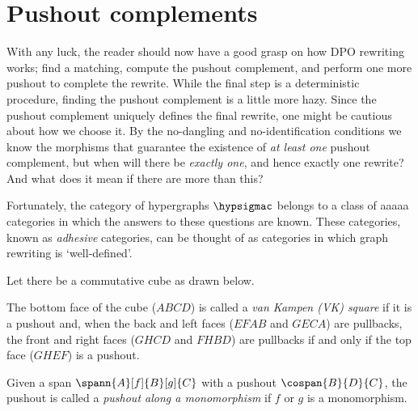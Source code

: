 \section{Pushout complements}

With any luck, the reader should now have a good grasp on how DPO rewriting
works; find a matching, compute the pushout complement, and perform one more
pushout to complete the rewrite.
While the final step is a deterministic procedure, finding the pushout
complement is a little more hazy.
Since the pushout complement uniquely defines the final rewrite, one might be
cautious about how we choose it.
By the no-dangling and no-identification conditions we know the morphisms that
guarantee the existence of \emph{at least one} pushout complement, but when will
there be \emph{exactly one}, and hence exactly one rewrite?
And what does it mean if there are more than this?

Fortunately, the category of hypergraphs \(\hypsigmac\) belongs to a class of
aaaaa categories in which the answers to these questions are known.
These categories, known as \emph{adhesive} categories, can be thought of as
categories in which graph rewriting is `well-defined'.

\begin{definition}
    Let there be a commutative cube as drawn below.
    \begin{center}
    \end{center}
    The bottom face of the cube (\(ABCD\)) is called a
    \emph{van Kampen (VK) square} if it is a pushout and, when the back and
    left faces (\(EFAB\) and \(GECA\)) are pullbacks, the front and right faces
    (\(GHCD\) and \(FHBD\)) are pullbacks if and only if the top face (\(GHEF\))
    is a pushout.
\end{definition}

\begin{definition}
    Given a span \(\spann{A}[f]{B}[g]{C}\) with a pushout \(\cospan{B}{D}{C}\),
    the pushout is called a \emph{pushout along a monomorphism} if \(f\) or
    \(g\) is a monomorphism.
\end{definition}

